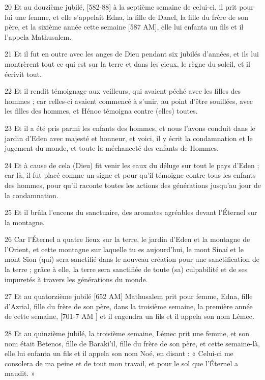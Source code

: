 \par 20 Et au douzième jubilé, [582-88] à la septième semaine de celui-ci, il prit pour lui une femme, et elle s'appelait Edna, la fille de Danel, la fille du frère de son père, et la sixième année cette semaine [587 AM], elle lui enfanta un fils et il l'appela Mathusalem.
\par 21 Et il fut en outre avec les anges de Dieu pendant six jubilés d'années, et ils lui montrèrent tout ce qui est sur la terre et dans les cieux, le règne du soleil, et il écrivit tout.
\par 22 Et il rendit témoignage aux veilleurs, qui avaient péché avec les filles des hommes ; car celles-ci avaient commencé à s'unir, au point d'être souillées, avec les filles des hommes, et Hénoc témoigna contre (elles) toutes.
\par 23 Et il a été pris parmi les enfants des hommes, et nous l'avons conduit dans le jardin d'Eden avec majesté et honneur, et voici, il y écrit la condamnation et le jugement du monde, et toute la méchanceté des enfants de Hommes.
\par 24 Et à cause de cela (Dieu) fit venir les eaux du déluge sur tout le pays d'Eden ; car là, il fut placé comme un signe et pour qu'il témoigne contre tous les enfants des hommes, pour qu'il raconte toutes les actions des générations jusqu'au jour de la condamnation.
\par 25 Et il brûla l'encens du sanctuaire, des aromates agréables devant l'Éternel sur la montagne.
\par 26 Car l'Éternel a quatre lieux sur la terre, le jardin d'Eden et la montagne de l'Orient, et cette montagne sur laquelle tu es aujourd'hui, le mont Sinaï et le mont Sion (qui) sera sanctifié dans le nouveau création pour une sanctification de la terre ; grâce à elle, la terre sera sanctifiée de toute (sa) culpabilité et de ses impuretés à travers les générations du monde.
\par 27 Et au quatorzième jubilé [652 AM] Mathusalem prit pour femme, Edna, fille d'Azrial, fille du frère de son père, dans la troisième semaine, la première année de cette semaine, [701-7 AM ] et il engendra un fils et il appela son nom Lémec.
\par 28 Et au quinzième jubilé, la troisième semaine, Lémec prit une femme, et son nom était Betenos, fille de Baraki'il, fille du frère de son père, et cette semaine-là, elle lui enfanta un fils et il appela son nom Noé, en disant : « Celui-ci me consolera de ma peine et de tout mon travail, et pour le sol que l'Éternel a maudit. »
